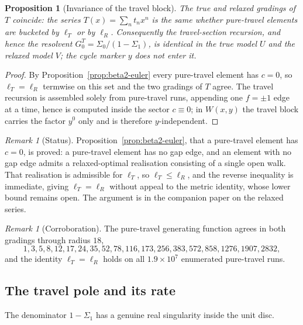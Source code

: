 \documentclass[11pt]{article}
\theoremstyle{plain}
\newtheorem{proposition}[theorem]{Proposition}
\theoremstyle{definition}
\theoremstyle{remark}
\newtheorem{remark}[theorem]{Remark}
\begin{document}
\begin{proposition}[Invariance of the travel block]
\label{prop:beta2-travelinv}
The true and relaxed gradings of $T$ coincide: the series $T(x)=\sum_n t_n x^n$
is the same whether pure-travel elements are bucketed by $\ell_T$ or by
$\ell_R$. Consequently the travel-section recursion, and hence the resolvent
$G^{T}_0=\Sigma_0/(1-\Sigma_1)$, is identical in the true model $U$ and the
relaxed model $V$; the cycle marker $y$ does not enter it.
\end{proposition}

\begin{proof}
By Proposition~\ref{prop:beta2-euler} every pure-travel element has $c=0$, so
$\ell_T=\ell_R$ termwise on this set and the two gradings of $T$ agree. The
travel recursion is assembled solely from pure-travel runs, appending one
$f=\pm1$ edge at a time, hence is computed inside the sector $c\equiv0$; in
$W(x,y)$ the travel block carries the factor $y^0$ only and is therefore
$y$-independent.
\end{proof}

\begin{remark}[Status]
\label{rem:beta2-status}
Proposition~\ref{prop:beta2-euler}, that a pure-travel element has $c=0$, is proved: a pure-travel
element has no gap edge, and an element with no gap edge admits a relaxed-optimal realisation
consisting of a single open walk. That realisation is admissible for $\ell_T$, so
$\ell_T\le\ell_R$, and the reverse inequality is immediate, giving $\ell_T=\ell_R$ without appeal
to the metric identity, whose lower bound remains open. The argument is in the companion paper on
the relaxed series.
\end{remark}

\begin{remark}[Corroboration]
\label{rem:beta2-corrob}
The pure-travel generating function agrees in both gradings through radius $18$,
\[
  1,3,5,8,12,17,24,35,52,78,116,173,256,383,572,858,1276,1907,2832,
\]
and the identity $\ell_T=\ell_R$ holds on all $1.9\times10^{7}$ enumerated
pure-travel runs.
\end{remark}

\subsection{The travel pole and its rate}

The denominator $1-\Sigma_1$ has a genuine real singularity inside the unit
disc.
\end{document}
